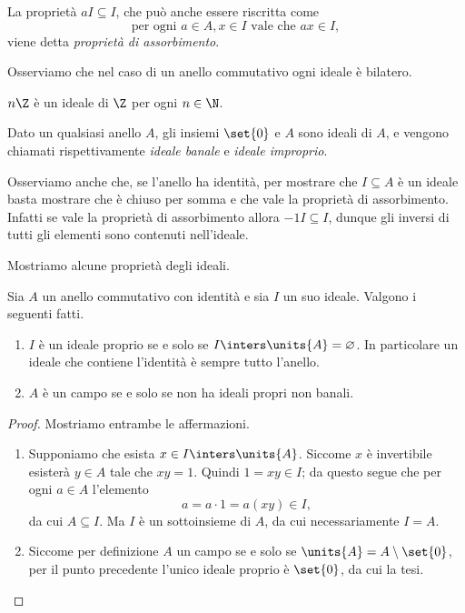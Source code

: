 La proprietà $aI \subseteq I$, che può anche essere riscritta come \[
    \text{per ogni } a \in A, x \in I \text{ vale che } ax \in I,
\] viene detta \emph{proprietà di assorbimento}.

Osserviamo che nel caso di un anello commutativo ogni ideale è bilatero.
\begin{example}
    $n\Z$ è un ideale di $\Z$ per ogni $n \in \N$.
\end{example}
\begin{example}
    Dato un qualsiasi anello $A$, gli insiemi $\set{0}$ e $A$ sono ideali di $A$, e vengono chiamati rispettivamente \emph{ideale banale} e \emph{ideale improprio}.
\end{example}

Osserviamo anche che, se l'anello ha identità, per mostrare che $I \subseteq A$ è un ideale basta mostrare che è chiuso per somma e che vale la proprietà di assorbimento. Infatti se vale la proprietà di assorbimento allora $-1I \subseteq I$, dunque gli inversi di tutti gli elementi sono contenuti nell'ideale.

Mostriamo alcune proprietà degli ideali.
\begin{proposition}{}{}
    Sia $A$ un anello commutativo con identità e sia $I$ un suo ideale. Valgono i seguenti fatti. 
    \begin{enumerate}[label={(\roman*)}]
        \item $I$ è un ideale proprio se e solo se $I \inters \units{A} = \varnothing$. In particolare un ideale che contiene l'identità è sempre tutto l'anello.
        \item $A$ è un campo se e solo se non ha ideali propri non banali.
    \end{enumerate}
\end{proposition}
\begin{proof}
    Mostriamo entrambe le affermazioni.
    \begin{enumerate}[label={(\roman*)}]
        \item Supponiamo che esista $x \in I \inters \units{A}$. Siccome $x$ è invertibile esisterà $y \in A$ tale che $xy = 1$. Quindi $1 = xy \in I$; da questo segue che per ogni $a \in A$ l'elemento \[
            a = a\cdot 1 = a(xy) \in I,
        \] da cui $A \subseteq I$. Ma $I$ è un sottoinsieme di $A$, da cui necessariamente $I = A$.
        \item Siccome per definizione $A$ un campo se e solo se $\units{A} = A \setminus \set{0}$, per il punto precedente l'unico ideale proprio è $\set{0}$, da cui la tesi. \qedhere
    \end{enumerate}
\end{proof}

